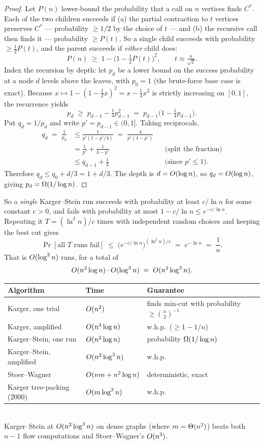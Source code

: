 \begin{proof}
Let $P(n)$ lower-bound the probability that a call on $n$ vertices finds $C^\ast$. Each of the two children succeeds if (a) the partial contraction to $t$ vertices preserves $C^\ast$ --- probability $\ge 1/2$ by the choice of $t$ --- and (b) the recursive call then finds it --- probability $\ge P(t)$. So a single child succeeds with probability $\ge \tfrac12 P(t)$, and the parent succeeds if \emph{either} child does:
\[
  P(n) \;\ge\; 1 - \Big(1 - \tfrac12 P(t)\Big)^2, \qquad t\approx \tfrac{n}{\sqrt2}.
\]
Index the recursion by depth: let $p_d$ be a lower bound on the success probability at a node $d$ levels above the leaves, with $p_0=1$ (the brute-force base case is exact). Because $x\mapsto 1-(1-\tfrac12 x)^2 = x - \tfrac14 x^2$ is strictly increasing on $[0,1]$, the recurrence yields
\[
  p_d \;\ge\; p_{d-1} - \tfrac14 p_{d-1}^2 \;=\; p_{d-1}\bigl(1-\tfrac14 p_{d-1}\bigr).
\]
Put $q_d=1/p_d$ and write $p'=p_{d-1}\in(0,1]$. Taking reciprocals,
\begin{align*}
  q_d \;=\; \frac{1}{p_d} &\le \frac{1}{p'(1-p'/4)} \;=\; \frac{4}{p'(4-p')}\\
      &= \frac{1}{p'} + \frac{1}{4-p'} && \text{(split the fraction)}\\
      &\le q_{d-1} + \frac13 && \text{(since $p'\le 1$)}.
\end{align*}
Therefore $q_d \le q_0 + d/3 = 1 + d/3$. The depth is $d=O(\log n)$, so $q_d=O(\log n)$, giving $p_d = \Omega(1/\log n)$.
\end{proof}

So a \emph{single} Karger--Stein run succeeds with probability at least $c/\ln n$ for some constant $c>0$, and fails with probability at most $1-c/\ln n\le e^{-c/\ln n}$. Repeating it $T=(\ln^2 n)/c$ times with independent random choices and keeping the best cut gives
\[
  \Pr[\text{all $T$ runs fail}] \;\le\; \bigl(e^{-c/\ln n}\bigr)^{(\ln^2 n)/c} \;=\; e^{-\ln n} \;=\; \frac1n.
\]
That is $O(\log^2 n)$ runs, for a total of
\[
  O(n^2\log n)\cdot O(\log^2 n) \;=\; O(n^2\log^3 n).
\]

\begin{complexitybox}
\begin{tabular}{lll}
\toprule
Algorithm & Time & Guarantee \\
\midrule
Karger, one trial & $O(n^2)$ & finds min-cut with probability $\ge \binom{n}{2}^{-1}$ \\
Karger, amplified & $O(n^4\log n)$ & w.h.p.\ ($\ge 1-1/n$) \\
Karger--Stein, one run & $O(n^2\log n)$ & probability $\Omega(1/\log n)$ \\
Karger--Stein, amplified & $O(n^2\log^3 n)$ & w.h.p.\ \\
Stoer--Wagner & $O(nm+n^2\log n)$ & deterministic, exact \\
Karger tree-packing (2000) & $O(m\log^3 n)$ & w.h.p.\ \\
\bottomrule
\end{tabular}\\[0.4em]
Karger--Stein at $O(n^2\log^3 n)$ on dense graphs (where $m=\Theta(n^2)$) beats both $n-1$ flow computations and Stoer--Wagner's $O(n^3)$.
\end{complexitybox}

